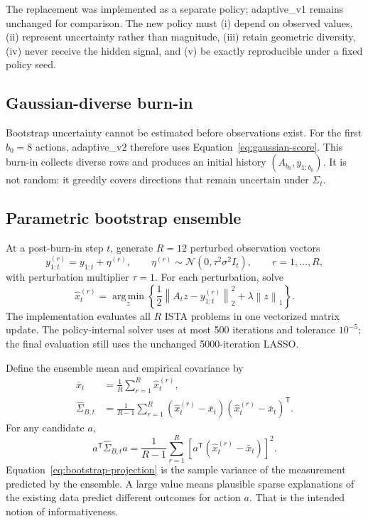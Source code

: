 \documentclass[11pt,a4paper]{article}
\newcommand{\argmin}{\operatorname*{arg\,min}}
\newcommand{\norm}[1]{\left\lVert #1\right\rVert}
\newcommand{\trans}{^{\mathsf T}}
\begin{document}
The replacement was implemented as a separate policy; adaptive\_v1 remains unchanged for
comparison.  The new policy must (i) depend on observed values, (ii) represent uncertainty
rather than magnitude, (iii) retain geometric diversity, (iv) never receive the hidden
signal, and (v) be exactly reproducible under a fixed policy seed.

\subsection{Gaussian-diverse burn-in}

Bootstrap uncertainty cannot be estimated before observations exist.  For the first
$b_0=8$ actions, adaptive\_v2 therefore uses Equation~\eqref{eq:gaussian-score}.  This
burn-in collects diverse rows and produces an initial history $(A_{b_0},y_{1:b_0})$.  It is
not random: it greedily covers directions that remain uncertain under $\Sigma_t$.

\subsection{Parametric bootstrap ensemble}

At a post-burn-in step $t$, generate $R=12$ perturbed observation vectors
\begin{equation}
y_{1:t}^{(r)}=y_{1:t}+\eta^{(r)},
\qquad
\eta^{(r)}\sim\mathcal{N}(0,\tau^2\sigma^2 I_t),
\qquad r=1,\ldots,R,
\label{eq:bootstrap-observations}
\end{equation}
with perturbation multiplier $\tau=1$.  For each perturbation, solve
\begin{equation}
\hat{x}_t^{(r)}
=\argmin_z
\left\{
\frac12\norm{A_tz-y_{1:t}^{(r)}}_2^2+\lambda\norm{z}_1
\right\} .
\label{eq:bootstrap-lasso}
\end{equation}
The implementation evaluates all $R$ ISTA problems in one vectorized matrix update.  The
policy-internal solver uses at most 500 iterations and tolerance $10^{-5}$; the final
evaluation still uses the unchanged 5000-iteration LASSO.

Define the ensemble mean and empirical covariance by
\begin{align}
\bar{x}_t&=\frac1R\sum_{r=1}^R\hat{x}_t^{(r)}, \\
\widehat{\Sigma}_{B,t}
&=\frac{1}{R-1}\sum_{r=1}^R
(\hat{x}_t^{(r)}-\bar{x}_t)(\hat{x}_t^{(r)}-\bar{x}_t)\trans .
\label{eq:bootstrap-covariance}
\end{align}
For any candidate $a$,
\begin{equation}
a\trans\widehat{\Sigma}_{B,t}a
=\frac{1}{R-1}\sum_{r=1}^R
\left[a\trans(\hat{x}_t^{(r)}-\bar{x}_t)\right]^2 .
\label{eq:bootstrap-projection}
\end{equation}
Equation~\eqref{eq:bootstrap-projection} is the sample variance of the measurement predicted
by the ensemble.  A large value means plausible sparse explanations of the existing data
predict different outcomes for action $a$.  That is the intended notion of informativeness.
\end{document}
